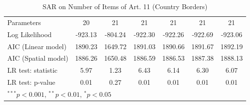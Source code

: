 \begin{table}[!h]
\begin{center}
\begin{tabular}{l c c c c c c }
Parameters              & 20           & 21           & 21           & 21           & 21           & 21           \\
Log Likelihood          & -923.13      & -804.24      & -922.30      & -922.26      & -922.69      & -923.06      \\
AIC (Linear model)      & 1890.23      & 1649.72      & 1891.03      & 1890.66      & 1891.67      & 1892.19      \\
AIC (Spatial model)     & 1886.26      & 1650.48      & 1886.59      & 1886.53      & 1887.38      & 1888.13      \\
LR test: statistic      & 5.97         & 1.23         & 6.43         & 6.14         & 6.30         & 6.07         \\
LR test: p-value        & 0.01         & 0.27         & 0.01         & 0.01         & 0.01         & 0.01         \\
\bottomrule
\multicolumn{7}{l}{\scriptsize{$^{***}p<0.001$, $^{**}p<0.01$, $^*p<0.05$}}
\end{tabular}
\caption{SAR on Number of Items of Art. 11 (Country Borders)}
\label{table:coefficients}
\end{center}
\end{table}
